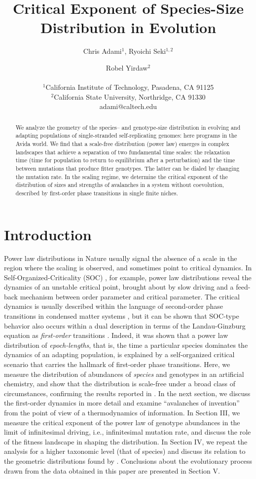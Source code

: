 \documentclass[letterpaper]{article}
\title{Critical Exponent of Species-Size Distribution in Evolution}
\author{Chris Adami$^{1}$, Ryoichi Seki$^{1,2}$ \and Robel Yirdaw$^2$ \\
\mbox{}\\
$^1$California Institute of Technology, Pasadena, CA 91125 \\
$^2$California State University, Northridge, CA 91330 \\
adami@caltech.edu}
\begin{document}
\maketitle

\begin{abstract}
  We analyze the geometry of the species-- and genotype-size
  distribution in evolving and adapting populations of single-stranded
  self-replicating genomes: here programs in the Avida world.  We find
  that a scale-free distribution (power law) emerges in complex
  landscapes that achieve a separation of two fundamental time scales:
  the relaxation time (time for population to return to equilibrium
  after a perturbation) and the time between mutations that produce
  fitter genotypes. The latter can be dialed by changing the mutation
  rate.  In the scaling regime, we determine the
  critical exponent of the distribution of sizes and strengths of
  avalanches in a system without coevolution, described by first-order
  phase transitions in single finite niches.
\end{abstract}

\section{Introduction}

Power law distributions in Nature usually signal the absence of a
scale in the region where the scaling is observed, and sometimes point
to critical dynamics. In Self-Organized-Criticality (SOC)
\citep{BTW87,BTW88}, for example, power law distributions reveal the
dynamics of an unstable critical point, brought about by slow driving
and a feed-back mechanism between order parameter and critical
parameter.  The critical dynamics is usually described within the
language of second-order phase transitions in condensed matter systems
\citep{SJD}, but it can be shown that SOC-type behavior also occurs
within a dual description in terms of the Landau-Ginzburg equation as
{\em first-order} transitions \citep{GS}.  Indeed, it was shown that a
power law distribution of {\em epoch-lengths}, that is, the time a
particular species dominates the dynamics of an adapting population,
is explained by a self-organized critical scenario \citep{CA2} that
carries the hallmark of first-order phase transitions. Here, we
measure the distribution of abundances of {\em species} and genotypes
in an artificial chemistry, \citep[the Avida Artificial Life
system][]{AB1,OBA} and show that the distribution is scale-free under
a broad class of circumstances, confirming the results reported in
\citep{CA2}.  In the next section, we discuss the first-order dynamics
in more detail and examine ``avalanches of invention'' from the point
of view of a thermodynamics of information. In Section III, we measure
the critical exponent of the power law of genotype abundances in the
limit of infinitesimal driving, i.e., infinitesimal mutation rate, and
discuss the role of the fitness landscape in shaping the
distribution. In Section IV, we repeat the analysis for a higher
taxonomic level (that of species) and discuss its relation to the
geometric distributions found by \citet{BUR90,BUR93}.
Conclusions about the evolutionary process drawn from the data
obtained in this paper are presented in Section V.
\end{document}
